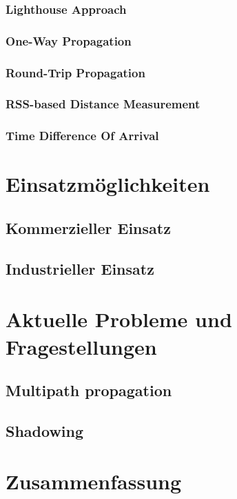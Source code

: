 \documentclass[12pt, a4wide]{scrreprt}
\begin{document}
    \subsection{Lighthouse Approach}
    \subsection{One-Way Propagation}
    \subsection{Round-Trip Propagation}
    \subsection{RSS-based Distance Measurement}
    \subsection{Time Difference Of Arrival}

\chapter{Einsatzmöglichkeiten}
  \section{Kommerzieller Einsatz}
  \section{Industrieller Einsatz}

\chapter{Aktuelle Probleme und Fragestellungen}
  \section{Multipath propagation}
  \section{Shadowing}

\chapter{Zusammenfassung}

\newpage
%


\begin{multicols}{2}

\nocite{*}
\end{multicols}
\end{document}

